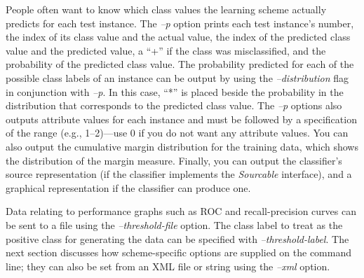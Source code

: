 People often want to know which class values the learning scheme
actually predicts for each test instance. The \textit{--p} option
prints each test instance's number, the index of its class value and
the actual value, the index of the predicted class value and the
predicted value, a ``+'' if the class was misclassified, and the
probability of the predicted class value. The probability predicted
for each of the possible class labels of an instance can be output by
using the \textit{--distribution} flag in conjunction
with \textit{--p}. In this case, ``*'' is placed beside the
probability in the distribution that corresponds to the predicted
class value. The \textit{--p} options also outputs attribute values
for each instance and must be followed by a specification of the range
(e.g., 1--2)---use 0 if you do not want any attribute values. You can
also output the cumulative margin distribution for the training data,
which shows the distribution of the margin measure. Finally, you can
output the classifier's source representation (if the classifier
implements the {\em Sourcable} interface), and a graphical
representation if the classifier can produce one.

Data relating to performance graphs such as ROC and recall-precision
curves can be sent to a file using the \textit{--threshold-file}
option. The class label to treat as the positive class for generating
the data can be specified with \textit{--threshold-label}. The next
section discusses how scheme-specific options are supplied on the
command line; they can also be set from an XML file or string using
the \textit{--xml} option.


